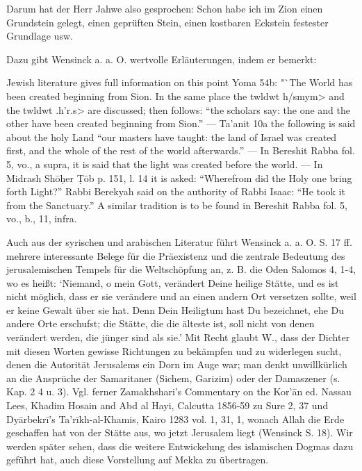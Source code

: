 \documentclass[a4paper, 11pt, oneside]{article}
\begin{document}
Darum hat der Herr Jahwe also gesprochen:  
Schon habe ich im Zion einen Grundstein gelegt, einen geprüften Stein, einen kostbaren Eckstein festester Grundlage usw.

Dazu gibt Wensinck a. a. O. wertvolle Erläuterungen, indem er bemerkt:

Jewish literature gives full information on this point Yoma 54b: "`The World has been created beginning from Sion. In the same place the \<twldwt h/smym> and the \<twldwt .h'r.s> are discussed; then follows: "`the scholars say: the one and the other have been created beginning from Sion."' --- Ta'anit 10a the following is said about the holy Land "`our masters have taught: the land of Israel was created first, and the whole of the rest of the world afterwards."' --- In Bereshit Rabba fol. 5, vo., a supra, it is said that the light was created before the world. --- In Midrash Shō\d{h}er \d{T}ōb p. 151, l. 14 it is asked: "`Wherefrom did the Holy one bring forth Light?"' Rabbi Berekyah said on the authority of Rabbi Isaac: "`He took it from the Sanctuary."' A similar tradition is to be found in Bereshit Rabba fol. 5, vo., b., 11, infra.

Auch aus der syrischen und arabischen Literatur führt Wensinck a. a. O. S. 17 ff. mehrere interessante Belege für die Präexistenz und die zentrale Bedeutung des jerusalemischen Tempels für die Weltschöpfung an, z. B. die Oden Salomos 4, 1-4, wo es heißt: `Niemand, o mein Gott, verändert Deine heilige Stätte, und es ist nicht möglich, dass er sie verändere und an einen andern Ort versetzen sollte, weil er keine Gewalt über sie hat. Denn Dein Heiligtum hast Du bezeichnet, ehe Du andere Orte erschufst; die Stätte, die die älteste ist, soll nicht von denen verändert werden, die jünger sind als sie.' Mit Recht glaubt W., dass der Dichter mit diesen Worten gewisse Richtungen zu bekämpfen und zu widerlegen sucht, denen die Autorität Jerusalems ein Dorn im Auge war; man denkt unwillkürlich an die Ansprüche der Samaritaner (Sichem, Garizim) oder der Damaszener (s. Kap. 2 4 u. 3). Vgl. ferner Zamakhshari's Commentary on the Kor'ān ed. Nassau Lees, Khadim Hosain and Abd al Hayi, Calcutta 1856-59 zu Sure 2, 37 und Dyārbekrī's Ta'rīkh-al-Khamis, Kairo 1283 vol. 1, 31, 1, wonach Allah die Erde geschaffen hat von der Stätte aus, wo jetzt Jerusalem liegt (Wensinck S. 18). Wir werden später sehen, dass die weitere Entwickelung des islamischen Dogmas dazu geführt hat, auch diese Vorstellung auf Mekka zu übertragen.
\end{document}
